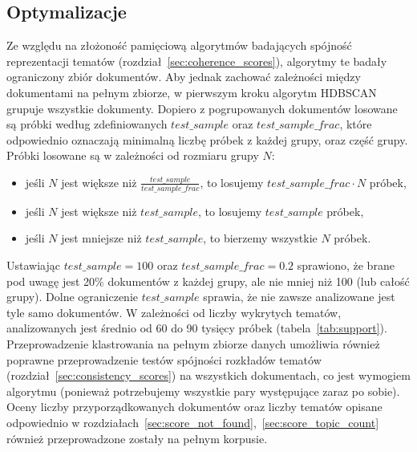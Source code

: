 	\subsection{Optymalizacje}
		Ze względu na złożoność pamięciową algorytmów badających spójność reprezentacji tematów (rozdział~\ref{sec:coherence_scores}),
			algorytmy te badały ograniczony zbiór dokumentów.
		Aby jednak zachować zależności między dokumentami na pełnym zbiorze, w pierwszym kroku algorytm HDBSCAN grupuje wszystkie dokumenty.
		Dopiero z pogrupowanych dokumentów losowane są próbki według zdefiniowanych \(test\_sample\) oraz \(test\_sample\_frac\),
			które odpowiednio oznaczają minimalną liczbę próbek z każdej grupy, oraz część grupy.
		Próbki losowane są w zależności od rozmiaru grupy \(N\):
		\begin{itemize}
			\item jeśli \(N\) jest większe niż \(\frac{test\_sample}{test\_sample\_frac}\), to losujemy \(test\_sample\_frac \cdot N\) próbek,
			\item jeśli \(N\) jest większe niż \(test\_sample\), to losujemy \(test\_sample\) próbek,
			\item jeśli \(N\) jest mniejsze niż \(test\_sample\), to bierzemy wszystkie \(N\) próbek.
		\end{itemize}
		Ustawiając \(test\_sample=100\) oraz \(test\_sample\_frac=0.2\) sprawiono,
			że brane pod uwagę jest 20\% dokumentów z każdej grupy, ale nie mniej niż 100 (lub całość grupy).
		Dolne ograniczenie \(test\_sample\) sprawia, że nie zawsze analizowane jest tyle samo dokumentów.
		W zależności od liczby wykrytych tematów, analizowanych jest średnio od 60 do 90 tysięcy próbek (tabela~\ref{tab:support}).
		Przeprowadzenie klastrowania na pełnym zbiorze danych umożliwia również poprawne przeprowadzenie testów spójności rozkładów tematów (rozdział~\ref{sec:consistency_scores})
			na wszystkich dokumentach, co jest wymogiem algorytmu (ponieważ potrzebujemy wszystkie pary występujące zaraz po sobie).
		Oceny liczby przyporządkowanych dokumentów oraz liczby tematów opisane odpowiednio w rozdziałach~\ref{sec:score_not_found},~\ref{sec:score_topic_count}
			również przeprowadzone zostały na pełnym korpusie.

